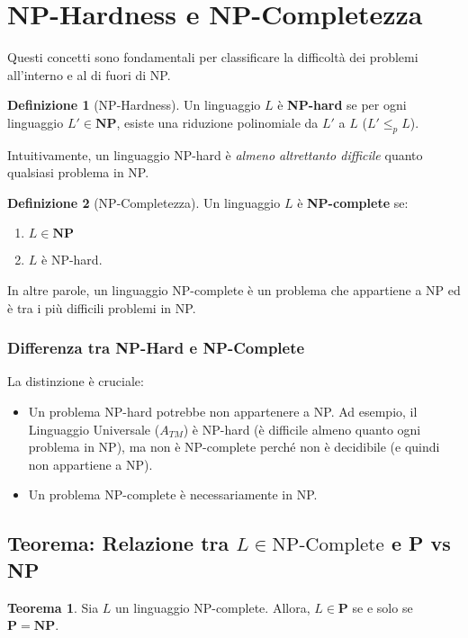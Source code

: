 \documentclass[a4paper]{article}
\theoremstyle{definition} %
\newtheorem{theorem}{Teorema}
\newtheorem{definition}{Definizione}
\begin{document}
\section{NP-Hardness e NP-Completezza}

Questi concetti sono fondamentali per classificare la difficoltà dei problemi all'interno e al di fuori di NP.

\begin{definition}[NP-Hardness]
Un linguaggio $L$ è \textbf{NP-hard} se per ogni linguaggio $L' \in \mathbf{NP}$, esiste una riduzione polinomiale da $L'$ a $L$ ($L' \le_p L$).
\end{definition}
Intuitivamente, un linguaggio NP-hard è \emph{almeno altrettanto difficile} quanto qualsiasi problema in NP.

\begin{definition}[NP-Completezza]
Un linguaggio $L$ è \textbf{NP-complete} se:
\begin{enumerate}
    \item $L \in \mathbf{NP}$
    \item $L$ è NP-hard.
\end{enumerate}
\end{definition}
In altre parole, un linguaggio NP-complete è un problema che appartiene a NP ed è tra i più difficili problemi in NP.

\subsubsection{Differenza tra NP-Hard e NP-Complete}
La distinzione è cruciale:
\begin{itemize}
    \item Un problema NP-hard potrebbe non appartenere a NP. Ad esempio, il Linguaggio Universale ($A_{TM}$) è NP-hard (è difficile almeno quanto ogni problema in NP), ma non è NP-complete perché non è decidibile (e quindi non appartiene a NP).
    \item Un problema NP-complete è necessariamente in NP.
\end{itemize}

\subsection{Teorema: Relazione tra $L \in \text{NP-Complete}$ e P vs NP}

\begin{theorem}
Sia $L$ un linguaggio NP-complete. Allora, $L \in \mathbf{P}$ se e solo se $\mathbf{P} = \mathbf{NP}$.
\end{theorem}
\end{document}
